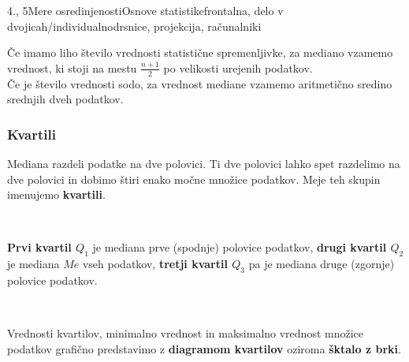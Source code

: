 \begin{priprava}{4., 5}{}{Mere osredinjenosti}{Osnove statistike}{frontalna, delo v dvojicah/individualno}{drsnice, projekcija, računalniki}
            ~
    
        Če imamo liho število vrednosti statistične spremenljivke, za mediano vzamemo vrednost, ki stoji na mestu $\frac{n+1}{2}$ po velikosti urejenih podatkov. \\
        Če je število vrednosti sodo, za vrednost mediane vzamemo aritmetično sredino srednjih dveh podatkov.
    


    \subsubsection{Kvartili}

    
        Mediana razdeli podatke na dve polovici. Ti dve polovici lahko spet razdelimo na dve polovici in dobimo štiri enako močne množice podatkov. 
        Meje teh skupin imenujemo \textbf{kvartili}.
    
            ~


        \textbf{Prvi kvartil $Q_1$} je mediana prve (spodnje) polovice podatkov, \textbf{drugi kvartil $Q_2$} je mediana $Me$ vseh podatkov,
        \textbf{tretji kvartil $Q_3$} pa je mediana druge (zgornje) polovice podatkov.
    
            ~
    
        Vrednosti kvartilov, minimalno vrednost in maksimalno vrednost množice podatkov grafično predstavimo
         z \textbf{diagramom kvartilov} oziroma \textbf{šktalo z brki}. \\~

        \begin{figure}[H]
        \centering
\end{figure}
\end{priprava}
